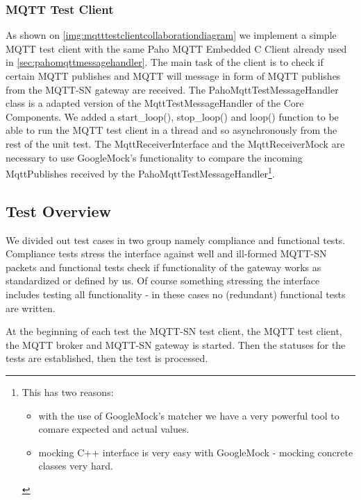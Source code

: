 \subsubsection{MQTT Test Client}
As shown on \autoref{img:mqtttestclientcollaborationdiagram} we implement a simple MQTT test client with the same Paho MQTT Embedded C Client already used in \autoref{sec:pahomqttmessagehandler}. 
The main task of the client is to check if certain MQTT publishes and MQTT will message in form of MQTT publishes from the MQTT-SN gateway are received.
The PahoMqttTestMessageHandler class is a adapted version of the MqttTestMessageHandler of the Core Components.
We added a start\_loop(), stop\_loop() and loop() function to be able to run the MQTT test client in a thread and so asynchronously from the rest of the unit test.
The MqttReceiverInterface and the MqttReceiverMock are necessary to use GoogleMock's functionality to compare the incoming MqttPublishes received by the PahoMqttTestMessageHandler\footnote{This has two reasons:
	\begin{itemize}
		\item with the use of GoogleMock's matcher we have a very powerful tool to comare expected and actual values.
		\item mocking C++ interface is very easy with GoogleMock - mocking concrete classes very hard.
	\end{itemize}
}.
\subsection{Test Overview}
We divided out test cases in two group namely compliance and functional tests.
Compliance tests stress the interface against well and ill-formed MQTT-SN packets and functional tests check if functionality of the gateway works as standardized or defined by us.
Of course something stressing the interface includes testing all functionality - in these cases no (redundant) functional tests are written.

At the beginning of each test the MQTT-SN test client, the MQTT test client, the MQTT broker and MQTT-SN gateway is started.
Then the statuses for the tests are established, then the test is processed.
